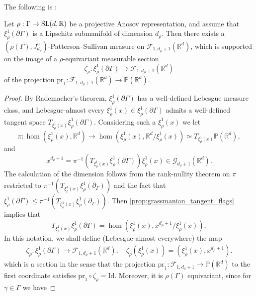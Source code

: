 \documentclass{report}
\begin{document}
The following is \cite[Proposition 6.4]{pozzetti_anosov_2023}:
\begin{proposition}\label{prop:PSMeasureExists}
    Let $\rho: \Gamma \to \operatorname{{\mathrm{SL}}}(d, \mathbb R)$ be a projective Anosov representation, and assume that $\xi^1_\rho(\partial \Gamma)$ is a Lipschitz submanifold of dimension $d_\rho$.
    Then there exists a $(\rho(\Gamma), J_{d_\rho}^u)$-Patterson--Sullivan measure on $\mathcal F_{1,d_\rho + 1}(\mathbb R^d)$, which is supported on the image of a $\rho$-equivariant measurable section
    \[
    \zeta_\rho: \xi_\rho^1(\partial \Gamma) \to \mathcal F_{1, d_\rho + 1}(\mathbb R^d)
    \]
    of the projection $\mathrm{pr}_1: \mathcal F_{1, d_\rho + 1}(\mathbb R^d) \to \mathbb P(\mathbb R^d)$.
\end{proposition}
\begin{proof}
    By Rademacher's theorem, $\xi^1_\rho(\partial \Gamma)$ has a well-defined Lebesgue measure class, and Lebesgue-almost every $\xi^1_\rho(x) \in \xi^1_\rho(\partial \Gamma)$ admits a well-defined tangent space $T_{\xi^1_\rho(x)} \xi^1_\rho(\partial \Gamma)$.
    Considering such a $\xi^1_\rho(x)$ we let
    \[
        \pi : \hom(\xi^1_\rho(x), \mathbb R^d) \to \hom(\xi^1_\rho(x), \mathbb R^d/\xi^1_\rho(x)) \simeq T_{\xi^1_\rho(x)} \mathbb P(\mathbb R^d),
    \]
    and
    \[
        x^{d_\rho + 1} = \pi^{-1} (T_{\xi^1_\rho(x)} \xi^1_\rho(\partial \Gamma)) \xi^1_\rho(x) \in 
        \mathcal G_{d_\rho + 1} (\mathbb R^d).
    \]
    The calculation of the dimension follows from the rank-nullity theorem on 
    $\pi$ restricted to  $\pi^{-1}(T_{\xi_\rho^1(x)} \xi_\rho^1(\partial_\Gamma))$ 
    and the fact that  
    $\xi_\rho^1(\partial \Gamma) \leq \pi^{-1}(T_{\xi_\rho^1(x)} \xi_\rho^1(\partial_\Gamma)) $. 
    Then \cref{prop:grassmanian_tangent_flags} implies that
    \[
        T_{\xi^1_\rho(x)} \xi^1_\rho(\partial \Gamma) = 
        \hom(\xi^1_\rho(x), x^{d_\rho + 1} / \xi^1_\rho(x)),
    \]
    In this notation, we shall define (Lebesgue-almost everywhere) the map
    \begin{align*}
        \zeta_\rho: \xi_\rho^1(\partial \Gamma) \to \mathcal F_{1, d_\rho + 1} (\mathbb R^d), \quad 
        \zeta_\rho(\xi_\rho^1(x)) = (\xi_\rho^1(x), x^{d_\rho + 1}).
    \end{align*}
    which is a section in the sense that the projection $\mathrm{pr}_1: \mathcal F_{1, d_\rho + 1} \to \mathbb P(\mathbb R^d)$ to the first coordinate satisfies $\mathrm{pr}_1 \circ \zeta_\rho = \mathrm{Id}$.
    Moreover, it is $\rho(\Gamma)$ equivariant, since for $\gamma \in \Gamma$ we have

\end{proof}
\end{document}
